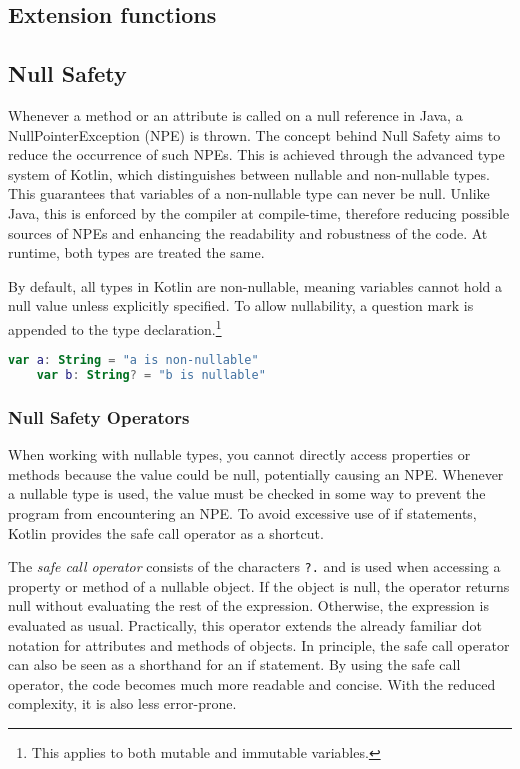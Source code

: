 \documentclass[a4paper, 11pt]{article}
\begin{document}
\subsection{Extension functions}

\subsection{Null Safety}
  Whenever a method or an attribute is called on a null reference in Java, a NullPointerException (NPE) is thrown. The concept behind Null Safety aims to reduce the occurrence of such NPEs. This is achieved through the advanced type system of Kotlin, which distinguishes between nullable and non-nullable types. This guarantees that variables of a non-nullable type can never be null. Unlike Java, this is enforced by the compiler at compile-time, therefore reducing possible sources of NPEs and enhancing the readability and robustness of the code. At runtime, both types are treated the same.
  
  By default, all types in Kotlin are non-nullable, meaning variables cannot hold a null value unless explicitly specified. To allow nullability, a question mark is appended to the type declaration.\footnote{This applies to both mutable and immutable variables.}

  \begin{lstlisting}[language=Kotlin]
    var a: String = "a is non-nullable"
    var b: String? = "b is nullable"
  \end{lstlisting}
  
\subsubsection{Null Safety Operators}
  When working with nullable types, you cannot directly access properties or methods because the value could be null, potentially causing an NPE. Whenever a nullable type is used, the value must be checked in some way to prevent the program from encountering an NPE. To avoid excessive use of if statements, Kotlin provides the safe call operator as a shortcut.

  The \textit{safe call operator} consists of the characters \texttt{?.} and is used when accessing a property or method of a nullable object. If the object is null, the operator returns null without evaluating the rest of the expression. Otherwise, the expression is evaluated as usual. Practically, this operator extends the already familiar dot notation for attributes and methods of objects. In principle, the safe call operator can also be seen as a shorthand for an if statement. By using the safe call operator, the code becomes much more readable and concise. With the reduced complexity, it is also less error-prone.
\end{document}

